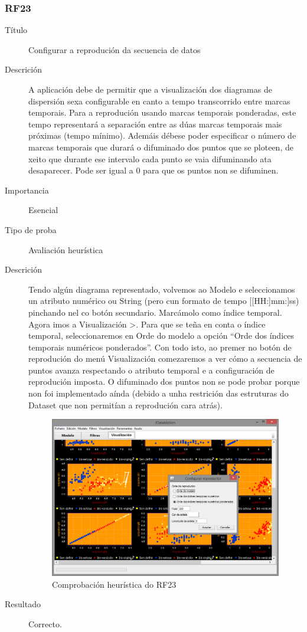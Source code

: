 \subsubsection*{RF23}
\begin{description}
\item[Título] \hfill
Configurar a reprodución da secuencia de datos
\item[Descrición] \hfill
A aplicación debe de permitir que a visualización dos diagramas de dispersión sexa configurable en canto a tempo transcorrido entre marcas temporais. Para a reprodución usando marcas temporais ponderadas, este tempo representará a separación entre as dúas marcas temporais mais próximas (tempo mínimo). Ademáis débese poder especificar o número de marcas temporais que durará o difuminado dos puntos que se ploteen, de xeito que durante ese intervalo cada punto se vaia difuminando ata desaparecer. Pode ser igual a 0 para que os puntos non se difuminen.
\item[Importancia] \hfill
Esencial
\item[Tipo de proba] \hfill
Avaliación heurística
\item[Descrición]
Tendo algún diagrama representado, volvemos ao Modelo e seleccionamos un atributo numérico ou String (pero cun formato de tempo [[HH:]mm:]ss) pinchando nel co botón secundario. Marcámolo como índice temporal. Agora imos a Visualización \textgreater{}. Para que se teña en conta o índice temporal, seleccionaremos en Orde do modelo a opción ``Orde dos índices temporais numéricos ponderados''. Con todo isto, ao premer no botón de reprodución do menú Visualización comezaremos a ver cómo a secuencia de puntos avanza respectando o atributo temporal e a configuración de reprodución imposta. O difuminado dos puntos non se pode probar porque non foi implementado aínda (debido a unha restrición das estruturas do Dataset que non permitían a reprodución cara atrás).
\begin{figure}
\centering
\includegraphics[width=\textwidth,height=\textheight,keepaspectratio]{figuras/RF23}
\caption{Comprobación heurística do RF23}
\label{RF23}
\end{figure}
\item[Resultado]
Correcto.
\end{description}

